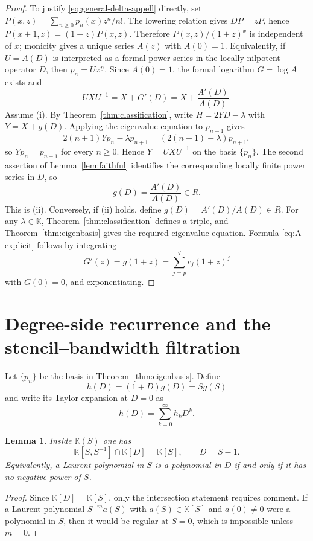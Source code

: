 \documentclass[11pt,reqno]{amsart}
\numberwithin{equation}{section}
\newtheorem{lemma}[theorem]{Lemma}
\theoremstyle{definition}
\theoremstyle{remark}
\newcommand{\K}{\mathbb K}
\begin{document}
\begin{proof}
To justify \eqref{eq:general-delta-appell} directly, set $P(x,z)=\sum_{n\ge0}p_n(x)z^n/n!$.  The lowering relation gives $DP=zP$, hence $P(x+1,z)=(1+z)P(x,z)$.  Therefore $P(x,z)/(1+z)^x$ is independent of $x$; monicity gives a unique series $A(z)$ with $A(0)=1$.  Equivalently, if $U=A(D)$ is interpreted as a formal power series in the locally nilpotent operator $D$, then $p_n=Ux^{\underline n}$.  Since $A(0)=1$, the formal logarithm $G=\log A$ exists and
\[
 UXU^{-1}=X+G'(D)=X+\frac{A'(D)}{A(D)}.
\]
Assume (i).  By Theorem~\ref{thm:classification}, write $H=2YD-\lambda$ with $Y=X+g(D)$.  Applying the eigenvalue equation to $p_{n+1}$ gives
\[
 2(n+1)Yp_n-\lambda p_{n+1}
 =(2(n+1)-\lambda)p_{n+1},
\]
so $Yp_n=p_{n+1}$ for every $n\ge0$.  Hence $Y=UXU^{-1}$ on the basis $\{p_n\}$.  The second assertion of Lemma~\ref{lem:faithful} identifies the corresponding locally finite power series in $D$, so
\[
 g(D)=\frac{A'(D)}{A(D)}\in R.
\]
This is (ii).  Conversely, if (ii) holds, define $g(D)=A'(D)/A(D)\in R$.  For any $\lambda\in\K$, Theorem~\ref{thm:classification} defines a triple, and Theorem~\ref{thm:eigenbasis} gives the required eigenvalue equation.  Formula \eqref{eq:A-explicit} follows by integrating
\[
 G'(z)=g(1+z)=\sum_{j=p}^{q}c_j(1+z)^j
\]
with $G(0)=0$, and exponentiating.
\end{proof}

\section{Degree-side recurrence and the stencil--bandwidth filtration}

Let $\{p_n\}$ be the basis in Theorem~\ref{thm:eigenbasis}.  Define
\begin{equation}\label{eq:h-def}
 h(D)=(1+D)g(D)=Sg(S)
\end{equation}
and write its Taylor expansion at $D=0$ as
\[
 h(D)=\sum_{k=0}^{\infty}h_kD^k.
\]

\begin{lemma}\label{lem:intersection}
Inside $\K(S)$ one has
\[
 \K[S,S^{-1}]\cap\K[D]=\K[S],
 \qquad D=S-1.
\]
Equivalently, a Laurent polynomial in $S$ is a polynomial in $D$ if and only if it has no negative power of $S$.
\end{lemma}

\begin{proof}
Since $\K[D]=\K[S]$, only the intersection statement requires comment.  If a Laurent polynomial $S^{-m}a(S)$ with $a(S)\in\K[S]$ and $a(0)\ne0$ were a polynomial in $S$, then it would be regular at $S=0$, which is impossible unless $m=0$.
\end{proof}
\end{document}
